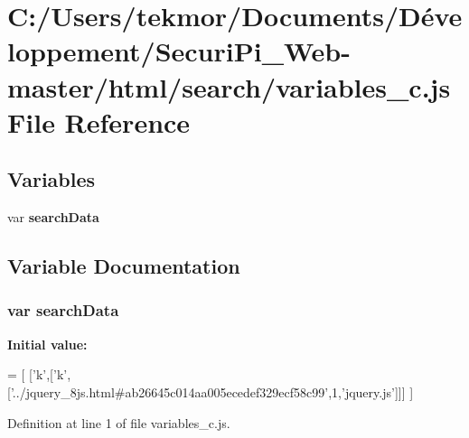 \section{C\+:/\+Users/tekmor/\+Documents/\+Développement/\+Securi\+Pi\+\_\+\+Web-\/master/html/search/variables\+\_\+c.js File Reference}
\label{variables__c_8js}
\subsection*{Variables}
\begin{DoxyCompactItemize}
\item 
var {\bf search\+Data}
\end{DoxyCompactItemize}


\subsection{Variable Documentation}
\subsubsection[{search\+Data}]{\setlength{\rightskip}{0pt plus 5cm}var search\+Data}\label{variables__c_8js_ad01a7523f103d6242ef9b0451861231e}
{\bfseries Initial value\+:}
\begin{DoxyCode}
=
[
  [\textcolor{charliteral}{'k'},[\textcolor{charliteral}{'k'},[\textcolor{stringliteral}{'../jquery\_8js.html#ab26645c014aa005ecedef329ecf58c99'},1,\textcolor{stringliteral}{'jquery.js'}]]]
]
\end{DoxyCode}


Definition at line 1 of file variables\+\_\+c.\+js.

